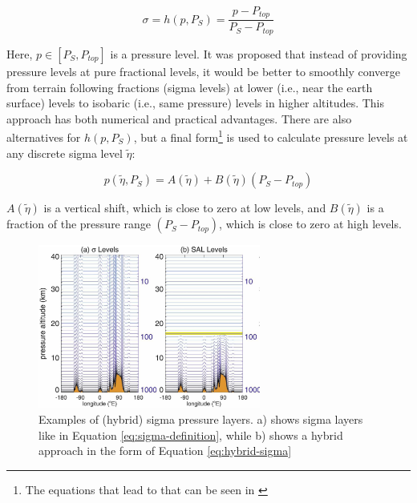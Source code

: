 \begin{equation}
\label{eq:sigma-definition}
\sigma = h(p,P_S) = \frac{p - P_{top}}{P_S - P_{top}}
\end{equation}

Here, $p \in [P_S, P_{top}]$ is a pressure level. 
It was proposed that instead of providing pressure levels at pure fractional levels, it would be better to smoothly converge from terrain following fractions (sigma levels) at lower (i.e., near the earth surface) levels to isobaric (i.e., same pressure) levels in higher altitudes. 
This approach has both numerical and practical advantages.
There are also alternatives for $h(p, P_S)$, but a final form\footnote{The equations that lead to that can be seen in \cite{eckermann_hybrid_2009}} is used to calculate pressure levels at any discrete sigma level $\tilde{\eta}$:

\begin{equation}
\label{eq:hybrid-sigma}
p(\tilde{\eta}, P_S) = A(\tilde{\eta}) + B(\tilde{\eta}) (P_S - P_{top})
\end{equation}


$A(\tilde{\eta})$ is a vertical shift, which is close to zero at low levels, and $B(\tilde{\eta})$ is a fraction of the pressure range $(P_S - P_{top})$, which is close to zero at high levels. 

\begin{figure}
  \begin{center}
    \includegraphics[width=0.65\textwidth]{figures/hybrid_sigma_pressure_layers.png}
  \end{center}
  \caption[Illustration of Hybrid Sigma Pressure Layers]{Examples of (hybrid) sigma pressure layers. a) shows sigma layers like in Equation \ref{eq:sigma-definition}, while b) shows a hybrid approach in the form of Equation \ref{eq:hybrid-sigma} \cite{eckermann_hybrid_2009}}\label{fig:hybrid-sigma}
\end{figure}



